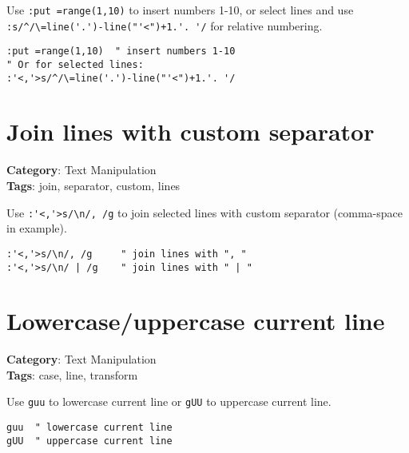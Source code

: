 {{{{{{{{{{{{{Use {\footnotesize \Verb§:put =range(1,10)§} to insert numbers 1-10, or select lines and use {\footnotesize \Verb§:s/^/\=line('.')-line("'<")+1.'. '/§} for relative numbering.

\begin{Exa*}{}
\begin{Verbatim}[fontsize=\footnotesize, breaklines, breakanywhere]
:put =range(1,10)  " insert numbers 1-10
" Or for selected lines:
:'<,'>s/^/\=line('.')-line("'<")+1.'. '/
\end{Verbatim}
\end{Exa*}

\section{Join lines with custom separator}

\textbf{Category}: Text Manipulation\\ \textbf{Tags}: join, separator, custom, lines
\vspace{0.5cm}

Use {\footnotesize \Verb§:'<,'>s/\n/, /g§} to join selected lines with custom separator (comma-space in example).

\begin{Exa*}{}
\begin{Verbatim}[fontsize=\footnotesize, breaklines, breakanywhere]
:'<,'>s/\n/, /g     " join lines with ", "
:'<,'>s/\n/ | /g    " join lines with " | "
\end{Verbatim}
\end{Exa*}

\section{Lowercase/uppercase current line}

\textbf{Category}: Text Manipulation\\ \textbf{Tags}: case, line, transform
\vspace{0.5cm}

Use {\footnotesize \Verb§guu§} to lowercase current line or {\footnotesize \Verb§gUU§} to uppercase current line.

\begin{Exa*}{}
\begin{Verbatim}[fontsize=\footnotesize, breaklines, breakanywhere]
guu  " lowercase current line
gUU  " uppercase current line
\end{Verbatim}
\end{Exa*}

}}}}}}}}}}}}}
